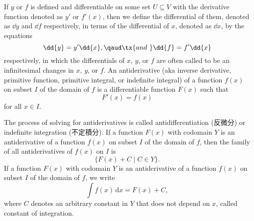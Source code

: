 \documentclass[a4paper,12pt]{report}
\begin{document}
\begin{itemize}
\begin{itemize}
If $y$ or $f$ is defined and differentiable on some set $U\subseteq V$ with the derivative function denoted as $y'$ or $f'(x)$, then we define the differential of them, denoted as $\dd{y}$ and $\dd{f}$ respectively, in terms of the differential of $x$, denoted as $\dd{x}$, by the equations
\[\dd{y}=y'\dd{x},\qaud \tx{and\ }\dd{f}=f'\dd{x}\]
respectively, in which the differentials of $x$, $y$, or $f$ are often called to be an infinitesimal changes in $x$, $y$, or $f$.
An antiderivative (aka inverse derivative, primitive function, primitive integral, or indefinite integral) of a function $f(x)$ on subset $I$ of the domain of $f$ is a differentiable function $F(x)$ such that
\[F'(x)=f(x)\]
for all $x\in I$.

The process of solving for antiderivatives is called antidifferentiation (反微分) or indefinite integration (不定積分).
If a function $F(x)$ with codomain $Y$ is an antiderivative of a function $f(x)$ on subset $I$ of the domain of $f$, then the family of all antiderivatives of $f(x)$ on $I$ is
\[\{F(x)+C\mid C\in Y\}.\]
If a function $F(x)$ with codomain $Y$ is an antiderivative of a function $f(x)$ on subset $I$ of the domain of $f$, we write
\[\int f(x)\,\mathrm{d}x=F(x)+C,\]
where $C$ denotes an arbitrary constant in $Y$ that does not depend on $x$, called constant of integration.

\end{itemize}
\end{itemize}
\end{document}
